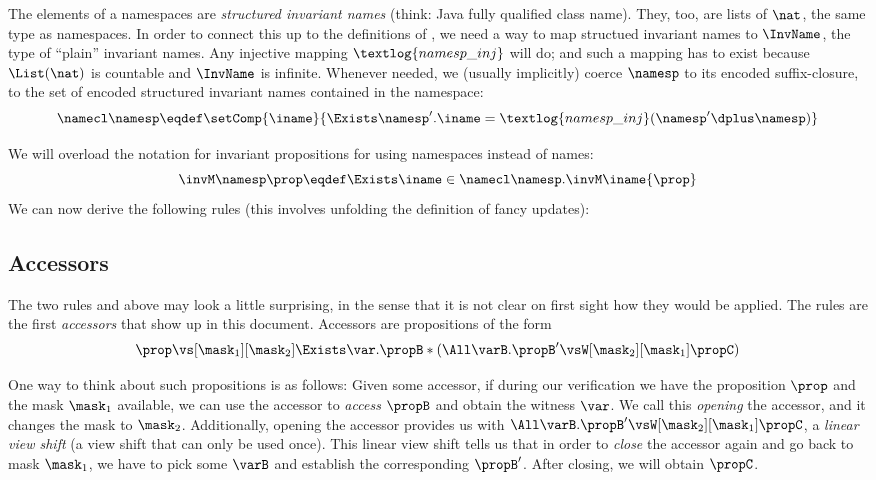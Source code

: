 The elements of a namespaces are \emph{structured invariant names} (think: Java fully qualified class name).
They, too, are lists of $\nat$, the same type as namespaces.
In order to connect this up to the definitions of , we need a way to map structued invariant names to $\InvName$, the type of ``plain'' invariant names.
Any injective mapping $\textlog{namesp\_inj}$ will do; and such a mapping has to exist because $\List(\nat)$ is countable and $\InvName$ is infinite.
Whenever needed, we (usually implicitly) coerce $\namesp$ to its encoded suffix-closure, \ie to the set of encoded structured invariant names contained in the namespace: \[\namecl\namesp \eqdef \setComp{\iname}{\Exists \namesp'. \iname = \textlog{namesp\_inj}(\namesp' \dplus \namesp)}\]

We will overload the notation for invariant propositions for using namespaces instead of names:
\[ \invM\namesp\prop \eqdef \Exists \iname \in \namecl\namesp. \invM\iname{\prop} \]
We can now derive the following rules (this involves unfolding the definition of fancy updates):

\subsection{Accessors}

The two rules  and  above may look a little surprising, in the sense that it is not clear on first sight how they would be applied.
The rules are the first \emph{accessors} that show up in this document.
Accessors are propositions of the form
\[ \prop \vs[\mask_1][\mask_2] \Exists\var. \propB * (\All\varB. \propB' \vsW[\mask_2][\mask_1] \propC) \]

One way to think about such propositions is as follows:
Given some accessor, if during our verification we have the proposition $\prop$ and the mask $\mask_1$ available, we can use the accessor to \emph{access} $\propB$ and obtain the witness $\var$.
We call this \emph{opening} the accessor, and it changes the mask to $\mask_2$.
Additionally, opening the accessor provides us with $\All\varB. \propB' \vsW[\mask_2][\mask_1] \propC$, a \emph{linear view shift} (\ie a view shift that can only be used once).
This linear view shift tells us that in order to \emph{close} the accessor again and go back to mask $\mask_1$, we have to pick some $\varB$ and establish the corresponding $\propB'$.
After closing, we will obtain $\propC$.

